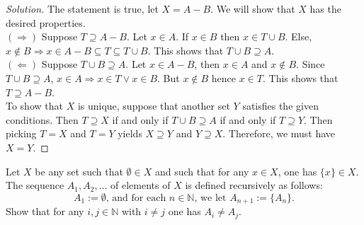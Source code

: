 \documentclass[12pt]{article}
\newenvironment{problem}[2][Problem]{\begin{trivlist}
\item[\hskip \labelsep {\bfseries #1}\hskip \labelsep {\bfseries #2.}]}{\end{trivlist}}
\begin{document}
\begin{proof}[Solution] The statement is true, let $X = A - B$. We will show that $X$ has the desired properties.
\\

$(\Rightarrow)$ Suppose $T \supseteq A - B$. Let $x \in A$. If $x \in B$ then $x \in T \cup B$. Else, $x \notin B \Rightarrow x \in A - B \subseteq T \subseteq T \cup B$. This shows that $T \cup B \supseteq A$. 
\\

$(\Leftarrow)$ Suppose $T \cup B \supseteq A$. Let $x \in A - B$, then $x \in A $ and $x \notin B$. Since $T \cup B \supseteq A$, $x \in A \Rightarrow x \in T \lor x \in B$. But $x \notin B$ hence $x \in T$. This shows that $T \supseteq A - B$.
\\

To show that $X$ is unique, suppose that another set $Y$ satisfies the given conditions. Then $T \supseteq X$ if and only if $T \cup B \supseteq A$ if and only if $T \supseteq Y$. Then picking $T = X$ and $T = Y$ yields $X \supseteq Y$ and $Y \supseteq X$. Therefore, we must have $X = Y$.
\end{proof}

\newpage

\begin{problem}{3}[10 points]
Let $X$ be any set such that $\emptyset \in X$ and such that for any $x \in X$, one has $\{x\} \in X$. The sequence $A_1, A_2, ...$ of elements of $X$ is defined recursively as follows:
\[A_1 := \emptyset \text{, and for each } n \in \mathbb{N} \text{, we let } A_{n+1} := \{A_n \}. \]
Show that for any $i, j \in \mathbb{N}$ with $ i \neq j$ one has $A_i \neq A_j$.
\end{problem}
\end{document}
